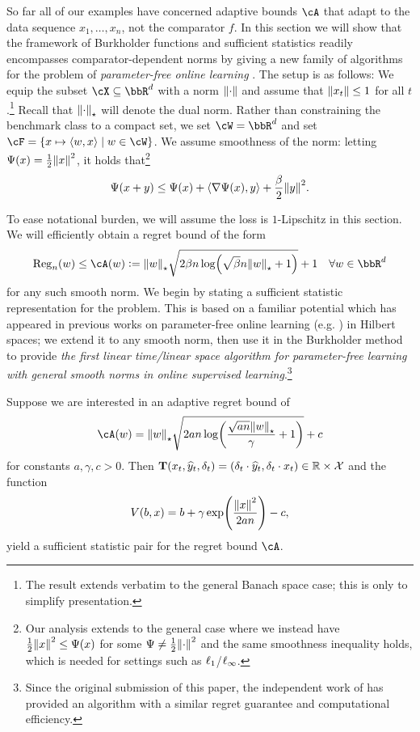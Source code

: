 
So far all of our examples have concerned adaptive bounds $\cA$ that adapt to the data sequence $x_{1},\ldots,x_{n}$, not the comparator $f$. In this section we will show that the framework of Burkholder functions and sufficient statistics readily encompasses comparator-dependent norms by giving a new family of algorithms for the problem of \emph{parameter-free online learning} \citep{mcmahan2014unconstrained}. The setup is as follows: We equip the subset $\cX\subseteq{}\bbR^{d}$ with a norm $\nrm*{\cdot}$ and assume that $\nrm*{x_{t}}\leq{}1$ for all $t$.\footnote{The result extends verbatim to the general Banach space case; this is only to simplify presentation.} Recall that $\norm{\cdot}_{\star}$ will denote the dual norm. Rather than constraining the benchmark class to a compact set, we set $\cW=\bbR^{d}$ and set $\cF=\crl*{x\mapsto\tri*{w,x}\mid{}w\in\cW}$. We assume smoothness of the norm: letting $\Psi(x) = \frac{1}{2}\nrm*{x}^{2}$, it holds that\footnote{Our analysis extends to the general case where we instead have  $\frac{1}{2}\nrm*{x}^{2}\leq{}\Psi(x)$ for some $\Psi\neq{}\frac{1}{2}\nrm*{\cdot}^{2}$ and the same smoothness inequality holds, which is needed for settings such as $\ls_1$/$\ls_{\infty}$.}
  \[
    \Psi(x+y) \leq{} \Psi(x) + \tri*{\grad{}\Psi(x), y} + \frac{\beta}{2}\nrm*{y}^{2}.
  \]


To ease notational burden, we will assume the loss is $1$-Lipschitz in this section. We will efficiently obtain a regret bound of the form
\begin{equation}
  \label{eq:regret_param}
\reg(w) \leq{} \cA(w) \ldef \nrm*{w}_{\star}\sqrt{2\beta{}n\log\prn*{\sqrt{\beta}n\nrm*{w}_{\star} + 1}} + 1 \quad\forall{}w\in\bbR^{d}
\end{equation}
for any such smooth norm. We begin by stating a sufficient statistic representation for the problem. This is based on a familiar potential which has appeared in previous works on parameter-free online learning (e.g. \citep{mcmahan2014unconstrained}) in Hilbert spaces; we extend it to any smooth norm, then use it in the Burkholder method to provide \emph{the first linear time/linear space algorithm for parameter-free learning with general smooth norms in online supervised learning}.\footnote{Since the original submission of this paper, the independent work of \citep{cutkosky2018blackbox} has provided an algorithm with a similar regret guarantee and computational efficiency.}

\begin{proposition}
  \label{prop:param_sufficient} Suppose we are interested in an adaptive regret bound of
\[
\cA(w) = \nrm*{w}_{\star}\sqrt{2an\log\prn*{\frac{\sqrt{an}\nrm*{w}_{\star}}{\gamma} + 1}} + c
\]
for constants $a,\gamma,c>0$. Then $\suff(x_t,\pred_t,\delta_t) = \left( \delta_t\cdot\pred_t, \delta_t\cdot x_t\right)\in\reals\times \X$ and the function
\begin{equation}
\label{eq:param_v}
V(b, x) = b + \gamma\exp\prn*{\frac{\nrm*{x}^{2}}{2an}} - c,
\end{equation}
yield a sufficient statistic pair for the regret bound $\cA$.

\end{proposition}

